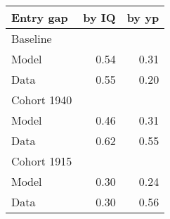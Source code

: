 \begin{tabular}{lrr}
\hline
Entry gap & by IQ  & by yp  \\ 
\hline
Baseline &   &   \\ 
Model & 0.54  & 0.31  \\ 
Data & 0.55  & 0.20  \\ 
Cohort 1940 &   &   \\ 
Model & 0.46  & 0.31  \\ 
Data & 0.62  & 0.55  \\ 
Cohort 1915 &   &   \\ 
Model & 0.30  & 0.24  \\ 
Data & 0.30  & 0.56  \\ 
\hline
\end{tabular}%
